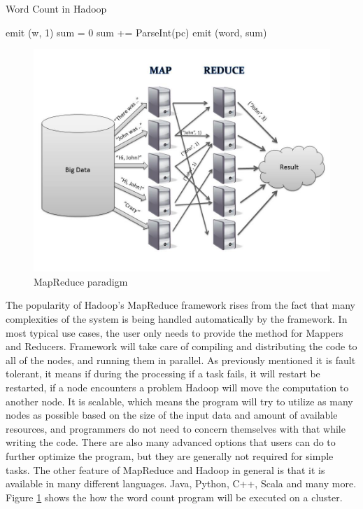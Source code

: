 \documentclass[english]{tktltiki}
\begin{document}
\begin{algorithm}
\caption{Word Count in Hadoop}
\label{alg:wordcount}
\begin{algorithmic}
      		\State emit (w, 1)
   \EndFor
\EndFunction
\State 
{}
  \State sum = 0
    \State sum += ParseInt(pc)
    \State emit (word, sum)
\EndFor
\EndFunction
\end{algorithmic}
\end{algorithm}

\begin{figure}[ht!]
\centering
\includegraphics[width=130mm]{figures/mapreduce.jpg}
\caption{MapReduce paradigm}
\label{fig:mapreducepara}
\end{figure}

The popularity of Hadoop's MapReduce framework rises from the fact that many complexities of the system is being handled automatically by the framework. In most typical use cases, the user only needs to provide the method for Mappers and Reducers. Framework will take care of compiling and distributing the code to all of the nodes, and running them in parallel. As previously mentioned it is fault tolerant, it means if during the processing if a task fails, it will restart be restarted, if a node encounters a problem Hadoop will move the computation to another node. It is scalable, which means the program will try to utilize as many nodes as possible based on the size of the input data and amount of available resources, and programmers do not need to concern themselves with that while writing the code. There are also many advanced options that users can do to further optimize the program, but they are generally not required for simple tasks. The other feature of MapReduce and Hadoop in general is that it is available in many different languages. Java, Python, C++, Scala and many more. Figure \ref{fig:mapreducepara} shows the how the word count program will be executed on a cluster.
\end{document}

